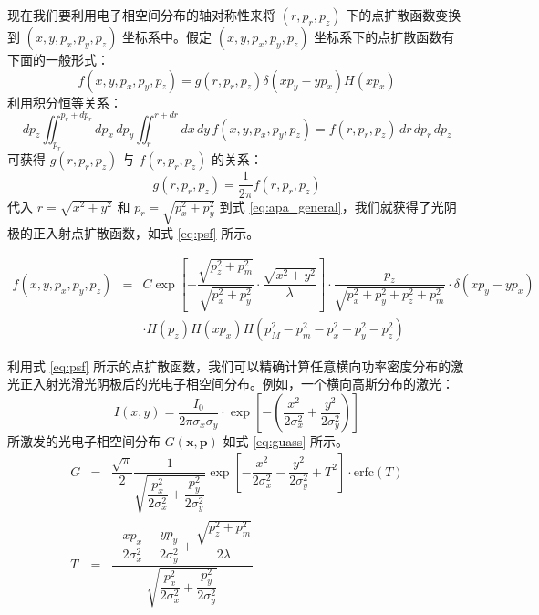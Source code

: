 现在我们要利用电子相空间分布的轴对称性来将 $(r, p_r, p_z)$ 下的点扩散函数变换到 $(x, y, p_x, p_y, p_z)$ 坐标系中。假定 $(x, y, p_x, p_y, p_z)$ 坐标系下的点扩散函数有下面的一般形式：
\begin{equation}
f(x, y, p_x, p_y, p_z) = g(r, p_r, p_z)\delta(xp_y-yp_x)H(xp_x)
\label{eq:apa_general}
\end{equation}
利用积分恒等关系：
\begin{equation}
dp_z\iint_{p_r}^{p_r+dp_r}\!\!\!dp_x\,dp_y\iint_{r}^{r+dr}\!\!\!dx\,dy\,f(x, y, p_x, p_y, p_z) = f(r, p_r, p_z)\,dr\,dp_r\,dp_z
\end{equation}
可获得 $g(r, p_r, p_z)$ 与 $f(r, p_r, p_z)$ 的关系：
\[
g(r, p_r, p_z) = \dfrac{1}{2\pi}f(r, p_r, p_z)
\]
代入 $r = \sqrt{x^2+y^2}$ 和 $p_r = \sqrt{p_x^2+p_y^2}$ 到式 \ref{eq:apa_general}，我们就获得了光阴极的正入射点扩散函数，如式 \ref{eq:psf} 所示。

\begin{eqnarray}
f(x, y, p_x, p_y, p_z)&=&C\exp\left[-\dfrac{\sqrt{p_z^2+p_m^2}}{\sqrt{p_x^2+p_y^2}}\cdot\dfrac{\sqrt{x^2+y^2}}{\lambda}\right]\cdot\dfrac{p_z}{\sqrt{p_x^2+p_y^2+p_z^2+p_m^2}}\cdot \delta(xp_y-yp_x)\nonumber\\
&&\cdot H(p_z)H(xp_x)H(p_M^2-p_m^2-p_x^2-p_y^2-p_z^2)
\label{eq:psf}
\end{eqnarray}

利用式 \ref{eq:psf} 所示的点扩散函数，我们可以精确计算任意横向功率密度分布的激光正入射光滑光阴极后的光电子相空间分布。例如，一个横向高斯分布的激光：
\[
I(x, y) = \dfrac{I_0}{2\pi\sigma_x\sigma_y}\cdot\exp\left[-\left(\dfrac{x^2}{2\sigma_x^2}+\dfrac{y^2}{2\sigma_y^2}\right)\right]
\]
所激发的光电子相空间分布 $G(\bm{x},\bm{p})$ 如式 \ref{eq:guass} 所示。
\begin{eqnarray}
G &=& \dfrac{\sqrt{\pi}}{2}\dfrac{1}{\sqrt{\dfrac{p_x^2}{2\sigma_x^2}+\dfrac{p_y^2}{2\sigma_y^2}}}\exp\left[-\dfrac{x^2}{2\sigma_x^2}-\dfrac{y^2}{2\sigma_y^2}+T^2\right]\cdot\text{erfc}(T)\nonumber\\
T &=& \dfrac{-\dfrac{xp_x}{2\sigma_x^2}-\dfrac{yp_y}{2\sigma_y^2}+\dfrac{\sqrt{p_z^2+p_m^2}}{2\lambda}}{\sqrt{\dfrac{p_x^2}{2\sigma_x^2}+\dfrac{p_y^2}{2\sigma_y^2}}}
\label{eq:guass}
\end{eqnarray}

